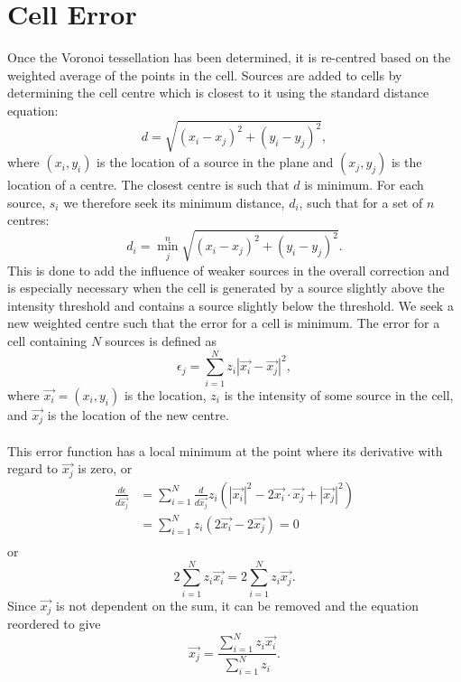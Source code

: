 \section{Cell Error}
Once the Voronoi tessellation has been determined, it is re-centred based on the weighted average of the points in the cell. Sources are added to cells by determining the cell centre which is closest to it using the standard distance equation:
\begin{equation}
d = \sqrt{(x_i - x_j)^2 + (y_i - y_j)^2},
\end{equation}
where $(x_i,y_i)$ is the location of a source in the plane and $(x_j,y_j)$ is the location of a centre. The closest centre is such that $d$ is minimum. For each source, $s_i$ we therefore seek its minimum distance, $d_i$, such that for a set of $n$ centres:
\begin{equation}
d_i = \min^n_j \sqrt{(x_i - x_j)^2 + (y_i - y_j)^2}.
\end{equation}
This is done to add the influence of weaker sources in the overall correction and is especially necessary when the cell is generated by a source slightly above the intensity threshold and contains a source slightly below the threshold. We seek a new weighted centre such that the error for a cell is minimum. The error for a cell containing $N$ sources is defined as
\begin{equation} \label{eq:cellerr}
	\epsilon_j = \sum^N_{i=1} z_i|\vec{x_i} - \vec{x_j}|^2,
\end{equation}
where $\vec{x_i} = (x_i,y_i)$ is the location, $z_i$ is the intensity of some source in the cell, and $\vec{x_j}$ is the location of the new centre. 
\\
\\
This error function has a local minimum at the point where its derivative with regard to $\vec{x_j}$ is zero, or
\begin{align*}
	\frac{d\epsilon}{d\vec{x_j}} &= \sum^N_{i=1} \frac{d}{d\vec{x_j}}z_i(|\vec{x_i}|^2 -2\vec{x_i}\cdot\vec{x_j} + |\vec{x_j}|^2) \\
	&= \sum^N_{i=1} z_i(2\vec{x_i} - 2\vec{x_j}) = 0 \\
\end{align*}
or
\begin{equation*}
	2\sum^N_{i=1} z_i\vec{x_i} = 2\sum^N_{i=1}z_i\vec{x_j}.
\end{equation*}
Since $\vec{x_j}$ is not dependent on the sum, it can be removed and the equation reordered to give
\begin{equation}
	\vec{x_j} = \frac{\sum^N_{i=1} z_i\vec{x_i}}{\sum^N_{i=1}z_i}.
\end{equation}
